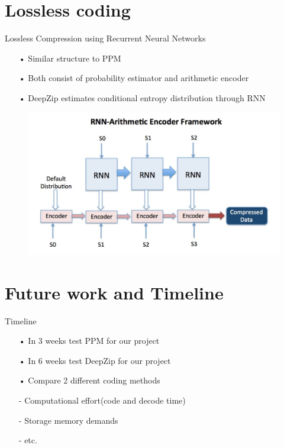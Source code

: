 \documentclass[notes=hide]{beamer}
\begin{document}
\section{Lossless coding}
\begin{frame}


   \begin{block}{Lossless Compression using Recurrent Neural Networks}
   	\begin{itemize}
   		\item [•] Similar structure to PPM
        \item [•] Both consist of probability estimator and arithmetic encoder
		\item [•] DeepZip estimates conditional entropy distribution through RNN 
   	\end{itemize}
   \end{block}
   \begin{figure}
   	\includegraphics[scale=0.4]{Vortrag/DeepZip.jpg}
   \end{figure}
\end{frame}


\newpage
\section{Future work and Timeline}
\begin{frame}


   \begin{block}{Timeline}
   	\begin{itemize}
   		\item [•] In 3 weeks test PPM for our project 
        \item [•] In 6 weeks test DeepZip for our project
		\item [•] Compare 2 different coding methods 
		\item [-] Computational effort(code and decode time)
		\item [-] Storage memory demands
		\item [-] etc.
   	\end{itemize}
   \end{block}
\end{frame}
\end{document}
